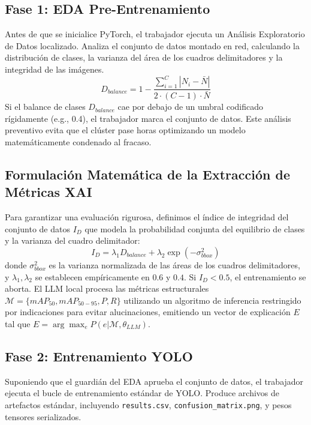 \documentclass[10pt,twocolumn,letterpaper]{article}
\begin{document}
\subsection{Fase 1: EDA Pre-Entrenamiento}
Antes de que se inicialice PyTorch, el trabajador ejecuta un Análisis Exploratorio de Datos localizado. Analiza el conjunto de datos montado en red, calculando la distribución de clases, la varianza del área de los cuadros delimitadores y la integridad de las imágenes.
\begin{equation}
    D_{balance} = 1 - \frac{\sum_{i=1}^{C} |N_i - \bar{N}|}{2 \cdot (C-1) \cdot \bar{N}}
\end{equation}
Si el balance de clases $D_{balance}$ cae por debajo de un umbral codificado rígidamente (e.g., 0.4), el trabajador marca el conjunto de datos. Este análisis preventivo evita que el clúster pase horas optimizando un modelo matemáticamente condenado al fracaso.


\subsection{Formulación Matemática de la Extracción de Métricas XAI}
Para garantizar una evaluación rigurosa, definimos el índice de integridad del conjunto de datos $I_D$ que modela la probabilidad conjunta del equilibrio de clases y la varianza del cuadro delimitador:
\begin{equation}
    I_D = \lambda_1 D_{balance} + \lambda_2 \exp(-\sigma_{bbox}^2)
\end{equation}
donde $\sigma_{bbox}^2$ es la varianza normalizada de las áreas de los cuadros delimitadores, y $\lambda_1, \lambda_2$ se establecen empíricamente en $0.6$ y $0.4$. Si $I_D < 0.5$, el entrenamiento se aborta. El LLM local procesa las métricas estructurales $\mathcal{M} = \{mAP_{50}, mAP_{50-95}, P, R\}$ utilizando un algoritmo de inferencia restringido por indicaciones para evitar alucinaciones, emitiendo un vector de explicación $E$ tal que $E = \arg\max_{e} P(e | \mathcal{M}, \theta_{LLM})$.

\subsection{Fase 2: Entrenamiento YOLO}
Suponiendo que el guardián del EDA aprueba el conjunto de datos, el trabajador ejecuta el bucle de entrenamiento estándar de YOLO. Produce archivos de artefactos estándar, incluyendo \texttt{results.csv}, \texttt{confusion\_matrix.png}, y pesos tensores serializados.
\end{document}

